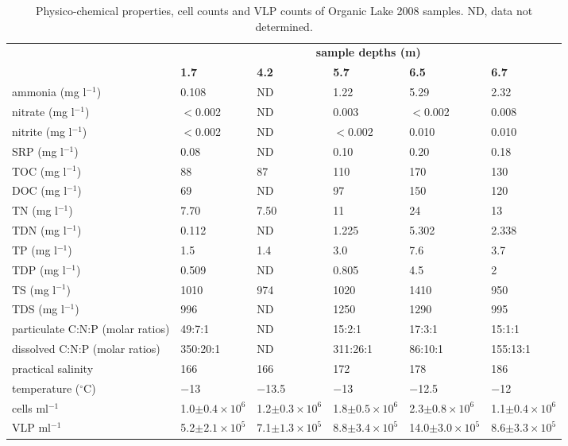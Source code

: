 \begin{table}
\footnotesize
\caption[Physico-chemical properties, cell counts and \ac{VLP} counts of Organic Lake 2008 samples]{Physico-chemical properties, cell counts and \ac{VLP} counts of Organic Lake 2008 samples. ND, data not determined.}
\label{tab:physico-chem}
\smallskip
\begin{tabularx}{\textwidth}{p{2.6cm}XXXXX}
\toprule
 & \multicolumn{5}{c}{\textbf{sample depths (m)}}\\
 & \textbf{1.7} & \textbf{4.2} & \textbf{5.7} & \textbf{6.5} & \textbf{6.7}\\
\midrule
ammonia (mg l$^{-1}$) & 0.108 & ND & 1.22 & 5.29 & 2.32 \\
nitrate (mg l$^{-1}$) & $<$0.002 & ND & 0.003 & $<$0.002 & 0.008 \\
nitrite (mg l$^{-1}$) & $<$0.002 & ND & $<$0.002 & 0.010 & 0.010 \\
\ac{SRP} (mg l$^{-1}$) & 0.08 & ND & 0.10 & 0.20 & 0.18 \\
\ac{TOC} (mg l$^{-1}$) & 88 & 87 & 110 & 170 & 130 \\
\ac{DOC} (mg l$^{-1}$) & 69 & ND & 97 & 150 & 120 \\
\ac{TN} (mg l$^{-1}$) & 7.70 & 7.50 & 11 & 24 & 13 \\
\ac{TDN} (mg l$^{-1}$) & 0.112 & ND & 1.225 & 5.302 & 2.338 \\
\ac{TP} (mg l$^{-1}$) & 1.5 & 1.4 & 3.0 & 7.6 & 3.7 \\
\ac{TDP} (mg l$^{-1}$) & 0.509 & ND & 0.805 & 4.5 & 2 \\
\ac{TS} (mg l$^{-1}$) & 1010 & 974 & 1020 & 1410 & 950 \\
\ac{TDS} (mg l$^{-1}$) & 996 & ND & 1250 & 1290 & 995 \\
particulate C:N:P (molar ratios) & 49:7:1 & ND & 15:2:1 & 17:3:1 & 15:1:1 \\
dissolved C:N:P (molar ratios) & 350:20:1 & ND & 311:26:1 & 86:10:1 & 155:13:1 \\
practical salinity & 166 & 166 & 172 & 178 & 186 \\
temperature ($^{\circ}$C) & $-$13 & $-$13.5 & $-$13 & $-$12.5 & $-$12 \\
cells ml$^{-1}$ & 1.0$\pm0.4 \times 10^6$ & 1.2$\pm0.3 \times 10^6$ & 1.8$\pm0.5 \times 10^6$ & 2.3$\pm0.8 \times 10^6$ & 1.1$\pm0.4 \times 10^6$ \\
\ac{VLP} ml$^{-1}$ & 5.2$\pm2.1 \times 10^5$ & 7.1$\pm1.3 \times 10^5$ & 8.8$\pm3.4 \times 10^5$ & 14.0$\pm3.0 \times 10^5$ & 8.6$\pm3.3 \times 10^5$ \\
\bottomrule
\end{tabularx}
\end{table}
